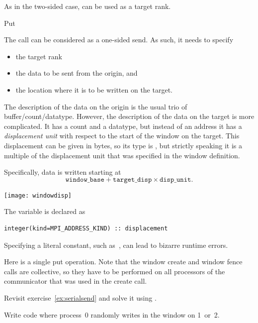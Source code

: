 As in the two-sided case,  can be used as
a target rank.

 {Put}

The  call can be considered as a one-sided
send. As such, it needs to specify
\begin{itemize}
\item the target rank
\item the data to be sent from the origin, and
\item the location where it is to be written on the target.
\end{itemize}

The description of the data on the origin is the usual trio of
buffer/count/datatype. However, the description of the data on the
target is more complicated. It has a count and a datatype, but instead
of an address it has a
\emph{displacement unit} with respect to the
start of the window on the target. This displacement can be given in
bytes, so its type is , but strictly speaking
it is a multiple of the displacement unit that was specified in the
window definition.

Specifically, data is written starting at
\[ \mathtt{window\_base} + \mathtt{target\_disp}\times \mathtt{disp\_unit}. \]

\texttt{[image: windowdisp]}

\begin{fortrannote}
  The  variable is declared as 
\lstset{style=reviewcode,language=Fortran} %
\begin{lstlisting}
integer(kind=MPI_ADDRESS_KIND) :: displacement
\end{lstlisting}
\lstset{style=reviewcode,language=C} %
  Specifying a literal constant, such as~, can lead to bizarre
  runtime errors.
\end{fortrannote}

Here is a single put operation. Note that the window create and window fence calls
are collective, so they have to be performed on all processors
of the communicator that was used in the create call.

\begin{exercise}
  \label{ex:rightput}
  Revisit exercise~\ref{ex:serialsend} and solve it using
  .
\end{exercise}

\begin{exercise}
  \label{ex:randomput}
  Write code where process~0 randomly writes in the window on 1~or~2.
\end{exercise}

